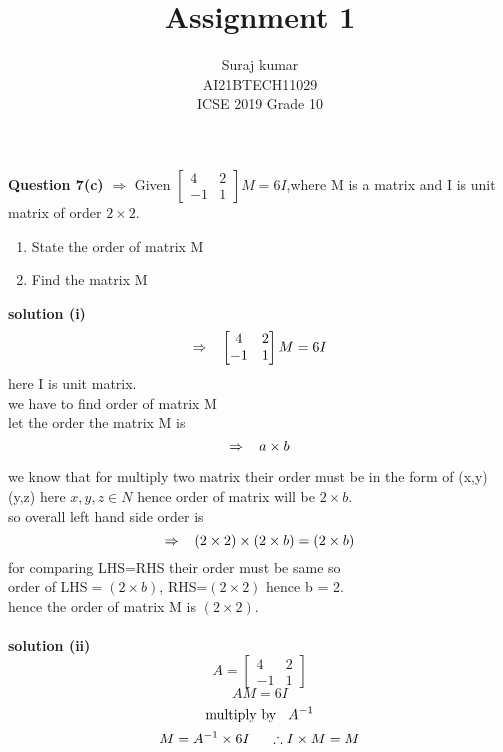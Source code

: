 \documentclass[journal,12pt,twocolumn]{IEEEtran}
\title{Assignment 1}
\author{Suraj kumar \\ \normalsize AI21BTECH11029\\\vspace*{20pt} \Large ICSE 2019 Grade 10}
\begin{document}
\maketitle
\textbf{Question 7(c)} $\Rightarrow$ Given $\begin{bmatrix}
     4 & 2 \\
     -1 & 1 
      \end{bmatrix}M=6I$,where M is a matrix and I is unit matrix of order $2\times 2.$
		\begin{enumerate}[label=(\roman*)]
		\item State the order of matrix M
		\item Find the matrix M
	\end{enumerate}	
 \textbf{solution (i) } $$\Rightarrow  \hspace{3mm} \begin{bmatrix}
     4 & 2 \\
     -1 & 1 
      \end{bmatrix}M=6I$$  
    here I is unit matrix.\\
    we have to find order of matrix M\\
    let the order the matrix M is  $$ \Rightarrow \hspace{3mm} a\times b$$
      
      we know that for multiply two matrix their order must be in the form of  (x,y) (y,z)  here $x,y,z \in N$
      hence order of matrix will be $2\times b$.\\
      so overall left hand side order is  $$\Rightarrow \hspace{3mm} (2\times 2)\times(2\times b) =(2\times b)$$
      for comparing LHS=RHS their order must be same so \\
      order of LHS$=(2\times b)$,
      RHS=$(2\times 2)$  hence b = 2.\\
      hence the order of matrix M is $(2\times 2).$\\\\

\textbf{solution (ii)}\\
\begin{equation}
    A=\begin{bmatrix}
      4 & 2\\
    -1 & 1
     \end{bmatrix}
     \end{equation}
     \begin{equation}
       AM=6I
     \end{equation}
    \begin{equation}
    \text{multiply by}\hspace{3mm} A^{-1}
    \end{equation}
    \begin{equation}
    M=A^{-1}\times 6I \hspace{5mm} \therefore I\times M=M
    \end{equation}     
   
\end{document}
